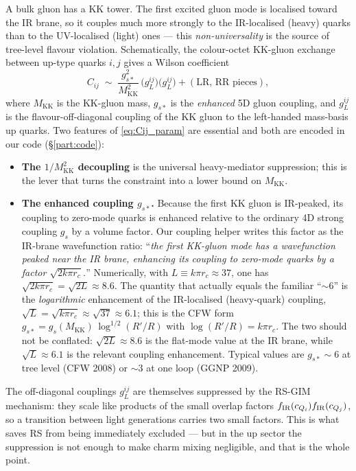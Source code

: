\documentclass[11pt]{article}
\newcommand{\MKK}{M_{\mathrm{KK}}}
\theoremstyle{definition}
\begin{document}
A bulk gluon has a KK tower. The first excited gluon mode is localised toward
the IR brane, so it couples much more strongly to the IR-localised (heavy)
quarks than to the UV-localised (light) ones --- this \emph{non-universality} is
the source of tree-level flavour violation. Schematically, the colour-octet
KK-gluon exchange between up-type quarks $i,j$ gives a Wilson coefficient
\begin{equation}
C_{ij} \;\sim\; \frac{g_{s*}^2}{\MKK^2}\,
\big(g_L^{ij}\big)\big(g_L^{ij}\big) + (\text{LR, RR pieces}),
\label{eq:Cij_param}
\end{equation}
where $\MKK$ is the KK-gluon mass, $g_{s*}$ is the \emph{enhanced} 5D gluon
coupling, and $g_L^{ij}$ is the flavour-off-diagonal coupling of the KK gluon
to the left-handed mass-basis up quarks. Two features of \eqref{eq:Cij_param}
are essential and both are encoded in our code (\S\ref{part:code}):
\begin{itemize}[leftmargin=1.4em]
\item \textbf{The $1/\MKK^2$ decoupling} is the universal heavy-mediator
suppression; this is the lever that turns the constraint into a lower bound on
$\MKK$.
\item \textbf{The enhanced coupling $g_{s*}$.} Because the first KK gluon is
IR-peaked, its coupling to zero-mode quarks is enhanced relative to the ordinary
4D strong coupling $g_s$ by a volume factor. Our coupling helper writes this
factor as the IR-brane wavefunction ratio: ``\emph{the first KK-gluon mode has a
wavefunction peaked near the IR brane, enhancing its coupling to zero-mode
quarks by a factor $\sqrt{2k\pi r_c}$.}'' Numerically, with
$L\equiv k\pi r_c\approx37$, one has $\sqrt{2k\pi r_c}=\sqrt{2L}\approx8.6$. The
quantity that actually equals the familiar ``$\sim6$'' is the
\emph{logarithmic} enhancement of the IR-localised (heavy-quark) coupling,
$\sqrt{L}=\sqrt{k\pi r_c}\approx\sqrt{37}\approx6.1$; this is the CFW form
$g_{s*}=g_s(\MKK)\,\log^{1/2}(R'/R)$ with $\log(R'/R)=k\pi r_c$. The two should
not be conflated: $\sqrt{2L}\approx8.6$ is the flat-mode value at the IR brane,
while $\sqrt{L}\approx6.1$ is the relevant coupling enhancement. Typical values
are $g_{s*}\sim6$ at tree level (CFW 2008) or $\sim3$ at one loop (GGNP 2009).
\end{itemize}
The off-diagonal couplings $g_L^{ij}$ are themselves suppressed by the
RS-GIM mechanism: they scale like products of the small overlap factors
$f_{\rm IR}(c_{Q_i})f_{\rm IR}(c_{Q_j})$, so a transition between light
generations carries two small factors. This is what saves RS from being
immediately excluded --- but in the up sector the suppression is not enough to
make charm mixing negligible, and that is the whole point.
\end{document}
